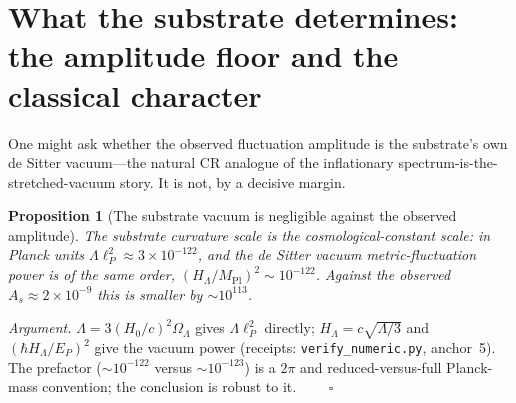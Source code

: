 \documentclass[11pt,a4paper]{article}
\theoremstyle{plain}
\newtheorem{proposition}{Proposition}
\theoremstyle{definition}
\theoremstyle{remark}
\newcommand{\Mpl}{M_{\mathrm{Pl}}}
\begin{document}
\section{What the substrate determines: the amplitude floor and the classical character}\label{sec:amplitude}

One might ask whether the observed fluctuation amplitude is the substrate's own de Sitter vacuum---the natural CR analogue of the inflationary spectrum-is-the-stretched-vacuum story. It is not, by a decisive margin.

\begin{proposition}[The substrate vacuum is negligible against the observed amplitude]\label{prop:amplitude}
The substrate curvature scale is the cosmological-constant scale: in Planck units $\Lambda\ell_P^2\approx3\times10^{-122}$, and the de Sitter vacuum metric-fluctuation power is of the same order, $(H_\Lambda/\Mpl)^2\sim10^{-122}$. Against the observed $A_s\approx2\times10^{-9}$ this is smaller by $\sim10^{113}$.
\end{proposition}

\noindent\emph{Argument.} $\Lambda=3(H_0/c)^2\Omega_\Lambda$ gives $\Lambda\ell_P^2$ directly; $H_\Lambda=c\sqrt{\Lambda/3}$ and $(\hbar H_\Lambda/E_P)^2$ give the vacuum power (receipts: \texttt{verify\_numeric.py}, anchor~5). The prefactor ($\sim10^{-122}$ versus $\sim10^{-123}$) is a $2\pi$ and reduced-versus-full Planck-mass convention; the conclusion is robust to it. $\qquad\square$
\end{document}
